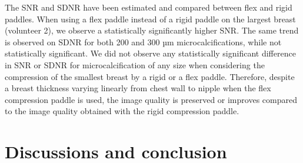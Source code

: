The SNR and SDNR have been estimated and compared between flex and rigid paddles. When using a flex paddle instead of a rigid paddle on the largest breast (volunteer 2), we observe a statistically significantly higher SNR. The same trend is observed on SDNR for both 200 and 300 µm microcalcifications, while not statistically significant. We did not observe any statistically significant difference in SNR or SDNR for microcalcification of any size when considering the compression of the smallest breast by a rigid or a flex paddle. Therefore, despite a breast thickness varying linearly from chest wall to nipple when the flex compression paddle is used, the image quality is preserved or improves compared to the image quality obtained with the rigid compression paddle.

\section{Discussions and conclusion}\label{section:compressionfem:conclusion}

